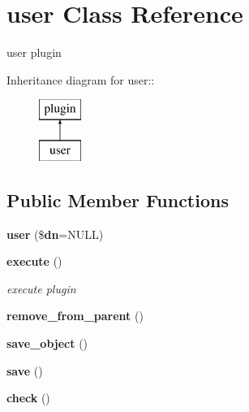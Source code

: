 \section{user Class Reference}
\label{classuser}
user plugin  


Inheritance diagram for user::\begin{figure}[H]
\begin{center}
\leavevmode
\includegraphics[height=2cm]{classuser}
\end{center}
\end{figure}
\subsection*{Public Member Functions}
\begin{CompactItemize}
\item 
{\bf user} (\${\bf dn}=NULL)\label{classuser_a0}

\item 
{\bf execute} ()
\begin{CompactList}\small\item\em execute plugin \item\end{CompactList}\item 
{\bf remove\_\-from\_\-parent} ()\label{classuser_a2}

\item 
{\bf save\_\-object} ()\label{classuser_a3}

\item 
{\bf save} ()\label{classuser_a4}

\item 
{\bf check} ()\label{classuser_a5}

\end{CompactItemize}
